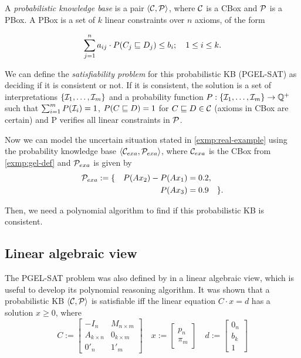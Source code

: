 A \emph{probabilistic knowledge base} is a pair $\langle\mathcal{C}, \mathcal{P}\rangle$, where $\mathcal{C}$ is a CBox and $\mathcal{P}$ is a PBox. A PBox is a set of $k$ linear constraints over $n$ axioms, of the form

\begin{equation}
	\label{eq:pbox-restric}
	\sum_{j = 1}^n a_{ij} \cdot P(C_j \sqsubseteq D_j) \leq b_i; \quad 1 \leq i \leq k.
\end{equation}

We can define the \emph{satisfiability problem} for this probabilistic KB (PGEL-SAT) as deciding if it is consistent or not. If it is consistent, the solution is a set of interpretations $\{\mathcal{I}_1, \dots, \mathcal{I}_m \}$ and a probability function $P: \{\mathcal{I}_1, \dots, \mathcal{I}_m \} \to \mathbb{Q}^+$ such that $\sum_{i = 1}^m P(\mathcal{I}_i) = 1$, $P(C \sqsubseteq D) = 1$ for $C \sqsubseteq D \in \mathcal{C}$ (axioms in CBox are certain) and P verifies all linear constraints in $\mathcal{P}$.
% 
\begin{example}
	Now we can model the uncertain situation stated in \autoref{exmp:real-example} using the probability knowledge base $\langle\mathcal{C}_{exa}, \mathcal{P}_{exa}\rangle$, where $\mathcal{C}_{exa}$ is the CBox from \autoref{exmp:gel-def} and $\mathcal{P}_{exa}$ is given by
	\begin{align*}
		\mathcal{P}_{exa} := \{ \quad P(Ax_2) - P(Ax_1) & = 0.2,           \\
		P(Ax_3)                                 & = 0.9  \quad \}.
	\end{align*}

	Then, we need a polynomial algorithm to find if this probabilistic KB is consistent.
\end{example}
% 
\subsection{Linear algebraic view}
\label{subsec:lin-alg-view}

The PGEL-SAT problem was also defined by \citet{Fin2020} in a linear algebraic view, which is useful to develop its polynomial reasoning algorithm. It was shown that a probabilistic KB $\langle\mathcal{C}, \mathcal{P}\rangle$ is satisfiable iff the linear equation $C \cdot x = d$ has a solution $x \geq 0$, where
% 
\begin{equation}
	\label{eq:pbox-linear}
	C := \begin{bmatrix}
		-I_n           & M_{n \times m} \\
		A_{k \times n} & 0_{k \times m} \\
		0'_n           & 1'_{m}
	\end{bmatrix}
	\quad
	x := \begin{bmatrix}
		p_n \\
		\pi_m
	\end{bmatrix}
	\quad
	d := \begin{bmatrix}
		0_n \\
		b_k \\
		1
	\end{bmatrix}
\end{equation}

